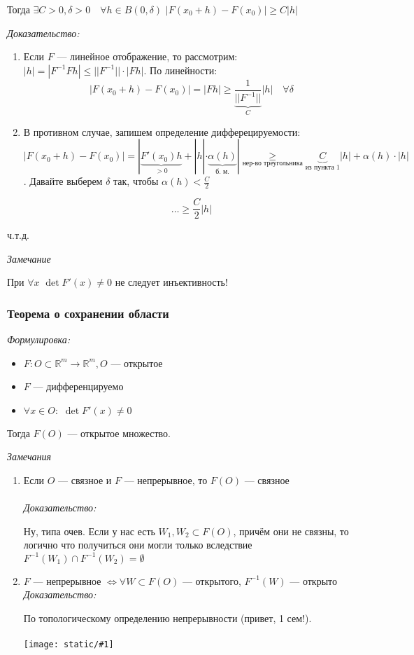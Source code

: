\documentclass{article}
\def\dbl{\,\,}
\def\image#1{\texttt{[image: static/\#1]}}
\begin{document}
Тогда $\exists C > 0, \delta > 0 \quad \forall h \in B(0, \delta) \dbl |F(x_0 + h) - F(x_0)| \ge C|h|$

\textit{Доказательство:}

\begin{enumerate}
    \item Если $F$ --- линейное отображение, то рассмотрим: $|h| = |F^{-1}Fh| \le ||F^{-1}|| \cdot |Fh|$. По линейности: 
    \[|F(x_0 + h) - F(x_0)| = |Fh| \ge \underbrace{\frac{1}{||F^{-1}||}}_{C}|h| \quad \forall \delta\]
    \item В противном случае, запишем определение дифферецируемости: $|F(x_0 + h) - F(x_0)| = |\underbrace{F'(x_0)h}_{> 0} + |h| \cdot \underbrace{\alpha(h)}_{\text{б. м.}}| \underset{\text{нер-во треугольника}}{\ge} \underbrace{C}_{\text{из пункта 1}}|h| + \alpha(h) \cdot |h|$. Давайте выберем $\delta$ так, чтобы $\alpha(h) < \frac{C}{2}$
    
    \[\ldots\ge \frac{C}{2}|h|\]
\end{enumerate}

ч.т.д.

\textit{Замечание}

При $\forall x \dbl \det F'(x) \neq 0$ не следует инъективность!

\subsubsection{Теорема о сохранении области}

\textit{Формулировка:}
\begin{itemize}
    \item $F: O \subset \mathbb{R}^m \rightarrow \mathbb{R}^m, O$ --- открытое
    \item $F$ --- дифференцируемо
    \item $\forall x \in O: \dbl \det F'(x) \neq 0$
\end{itemize}

Тогда $F(O)$ --- открытое множество.

\textit{Замечания}
\begin{enumerate}
    \item Если $O$ --- связное и $F$ --- непрерывное, то $F(O)$ --- связное\\\\
    \textit{Доказательство:}

    Ну, типа очев. Если у нас есть $W_1, W_2 \subset F(O)$, причём они не связны, то логично что получиться они могли только вследствие $F^{-1}(W_1) \cap F^{-1}(W_2) = \emptyset$
    \item $F$ --- непрерывное $\Leftrightarrow \forall W \subset F(O)$ --- открытого, $F^{-1}(W)$ --- открыто
    \textit{Доказательство:}

    По топологическому определению непрерывности (привет, 1 сем!).\\\\
    \image{sohr_obl_1.png}
\end{enumerate}
\end{document}
